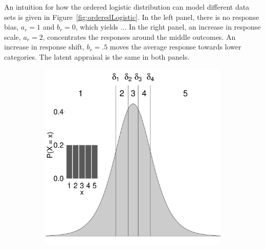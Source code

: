 \documentclass{article}
\newcommand{\Irater}{r}
\begin{document}
An intuition for how the ordered logistic distribution can model different data sets is given in Figure~\ref{fig:orderedLogistic}. In the left panel, there is no response bias, $a_\Irater = 1$ and $b_\Irater = 0$, which yields ... In the right panel, an increase in response scale, $a_\Irater = 2$, concentrates the responses around the middle outcomes. An increase in response shift, $b_\Irater = .5$ moves the average response towards lower categories. The latent appraisal is the same in both panels.
\begin{figure}[!ht]
	\centering
	\begin{subfigure}{.5\textwidth}
		\centering
		\includegraphics[width=.98\textwidth]{figures/orderedLogisticUnbiased.pdf}
	\end{subfigure}%
	\begin{subfigure}{.5\textwidth}
		\centering

\end{subfigure}
\end{figure}
\end{document}
